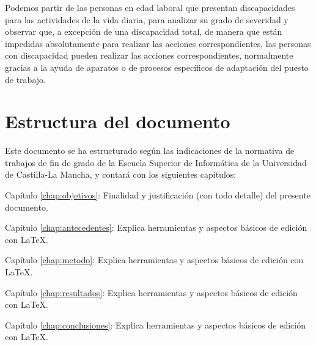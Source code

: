   Podemos partir de las personas en edad laboral que presentan discapacidades para las actividades de la vida diaria, para analizar su grado de severidad y observar que, a excepción de una discapacidad total, de manera que están impedidas absolutamente para realizar las acciones correspondientes, las personas con discapacidad pueden realizar las acciones correspondientes, normalmente gracias a la ayuda de aparatos o de procesos específicos de adaptación del puesto de trabajo.
  

 
  \section{Estructura del documento}

  Este documento se ha estructurado según las indicaciones de la normativa de trabajos de fin de grado de la Escuela Superior de Informática de la Universidad de Castilla-La Mancha, y contará con los siguientes capítulos:
  \begin{definitionlist}
  \item[Capítulo \ref{chap:objetivos}: \nameref{chap:objetivos}] Finalidad y justificación  (con todo detalle) del presente documento.
  \item[Capítulo \ref{chap:antecedentes}: \nameref{chap:antecedentes}] Explica herramientas y aspectos básicos de edición con \LaTeX.
  \item[Capítulo \ref{chap:metodo}: \nameref{chap:metodo}] Explica herramientas y aspectos básicos de edición con \LaTeX.
  \item[Capítulo \ref{chap:resultados}: \nameref{chap:resultados}] Explica herramientas y aspectos básicos de edición con \LaTeX.
  \item[Capítulo \ref{chap:conclusiones}: \nameref{chap:conclusiones}] Explica herramientas y aspectos básicos de edición con \LaTeX.
  \end{definitionlist}



